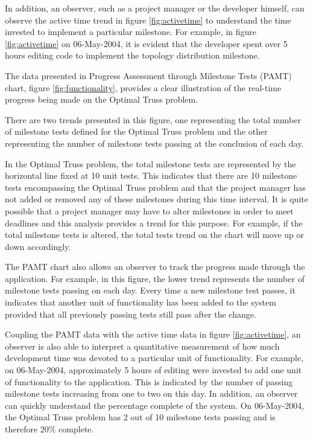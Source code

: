\documentclass[times,10pt,twocolumn]{article}
\begin{document}
In addition, an observer, such as a project manager or the developer
himself, can observe the active time trend in figure
\ref{fig:activetime} to understand the time invested to implement a
particular milestone.  For example, in figure \ref{fig:activetime} on
06-May-2004, it is evident that the developer spent over 5 hours
editing code to implement the topology distribution milestone.

\label{sec:devprogress}

The data presented in Progress Assessment through Milestone Tests (PAMT)
chart, figure \ref{fig:functionality}, provides a clear illustration
of the real-time progress being made on the Optimal Truss problem.

There are two trends presented in this figure, one representing the
total number of milestone tests defined for the Optimal Truss problem
and the other representing the number of milestone tests passing at
the conclusion of each day.  

In the Optimal Truss problem, the total milestone tests are
represented by the horizontal line fixed at 10 unit tests.  This
indicates that there are 10 milestone tests encompassing the Optimal
Truss problem and that the project manager has not added or removed
any of these milestones during this time interval.  It is quite
possible that a project manager may have to alter milestones in order
to meet deadlines and this analysis provides a trend for this purpose.
For example, if the total milestone tests is altered, the total tests
trend on the chart will move up or down accordingly.

The PAMT chart also allows an observer to track the progress made
through the application.  For example, in this figure, the lower trend
represents the number of milestone tests passing on each day.  Every
time a new milestone test passes, it indicates that another unit of
functionality has been added to the system provided that all
previously passing tests still pass after the change.

Coupling the PAMT data with the active time data in figure
\ref{fig:activetime}, an observer is also able to interpret a
quantitative measurement of how much development time was devoted to a
particular unit of functionality.  For example, on 06-May-2004,
approximately 5 hours of editing were invested to add one unit of
functionality to the application.  This is indicated by the number of
passing milestone tests increasing from one to two on this day.  In
addition, an observer can quickly understand the percentage complete
of the system.  On 06-May-2004, the Optimal Truss problem has 2 out of
10 milestone tests passing and is therefore 20\% complete.
\end{document}
